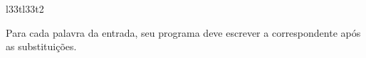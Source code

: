 \documentclass[12pt,a4paper,oneside]{article}
\begin{document}
\begin{problem}{l33t}{l33t}{2}
\endgroup

\OutputFile

Para cada palavra da entrada, seu programa deve escrever a correspondente após as substituições.


\Example

\begin{example}
%
\end{example}

\begin{example}
%
\end{example}


\end{problem}
\end{document}
